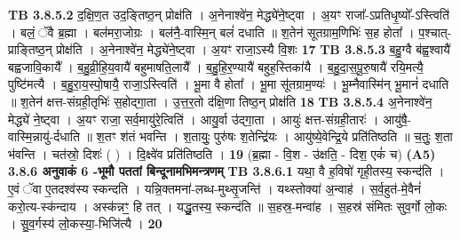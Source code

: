 \documentclass[17pt]{extarticle}
\begin{document}
{{{{{{{{{{{{{{{{{{{{{{                  \newline
                                \textbf{ TB 3.8.5.2} \newline
                  द॒क्षि॒ण॒त उद॒ङ्तिष्ठ॒न् प्रोक्ष॑ति । अ॒नेनाश्वे॑न॒ मेद्ध्ये॑ने॒ष्ट्वा । अ॒यꣳ राजा᳚-ऽप्रतिधृ॒ष्यो᳚-ऽस्त्विति॑ । बलं॒ ॅवै ब्र॒ह्मा । बल॑मरा॒जोग्रः । बल॑नै॒-वास्मि॒न् बलं॑ दधाति ॥ श॒तेन॑ सूतग्राम॒णिभिः॑ स॒ह होता᳚ । प॒श्चात्-प्राङ्तिष्ठ॒न् प्रोक्ष॑ति । अ॒नेनाश्वे॑न॒ मेद्ध्ये॑ने॒ष्ट्वा । अ॒यꣳ राजा॒ऽस्यै वि॒शः \textbf{ 17} \newline
                  \newline
                                \textbf{ TB 3.8.5.3} \newline
                  ब॒हु॒ग्वै ब॑ह्व॒श्वायै॑ बह्वजावि॒कायै᳚ । ब॒हु॒व्री॒हि॒य॒वायै॑ बहुमाषति॒लायै᳚ । ब॒हु॒हि॒र॒ण्यायै॑ बहुह॒स्तिका॑यै । ब॒हु॒दा॒स॒पू॒रु॒षायै॑ रयि॒मत्यै॒ पुष्टि॑मत्यै । ब॒हु॒रा॒य॒स्पो॒षायै॒ राजा॒ऽस्त्विति॑ । भू॒मा वै होता᳚ । भू॒मा सू॑तग्राम॒ण्यः॑ । भू॒म्नैवास्मि॑न् भू॒मानं॑ दधाति ॥ श॒तेन॑ क्षत्त-संग्रही॒तृभिः॑ स॒होद्गा॒ता । उ॒त्त॒र॒तो द॑क्षि॒णा तिष्ठ॒न् प्रोक्ष॑ति \textbf{ 18} \newline
                  \newline
                                \textbf{ TB 3.8.5.4} \newline
                  अ॒नेनाश्वे॑न॒ मेद्ध्ये॑ ने॒ष्ट्वा । अ॒यꣳ राजा॒ सर्व॒मायु॑रे॒त्विति॑ । आयु॒र्वा उ॑द्गा॒ता । आयुः॑ क्षत्त-संग्रही॒तारः॑ । आयु॑षै॒-वास्मि॒न्नायु॑-र्दधाति ॥ श॒तꣳ श॑तं भवन्ति । श॒तायुः॒ पुरु॑षः श॒तेन्द्रि॑यः । आयु॑ष्ये॒वेन्द्रि॒ये प्रति॑तिष्ठति ॥ च॒तुः॒ श॒ता भ॑वन्ति । चत॑स्रो॒ दिशः॑ ( ) । दि॒क्ष्वे॑व प्रति॑तिष्ठति । \textbf{ 19} \newline
                  \newline
                                    (ब्र॒ह्मा - वि॒श - उ॑क्षति॒ - दिश॒ एकं॑ च) \textbf{(A5)} \newline \newline
                \textbf{ 3.8.6     अनुवाकं   6 -भूमौ पततां बिन्दूनामभिमन्त्रणम्} \newline
                                \textbf{ TB 3.8.6.1} \newline
                  यथा॒ वै ह॒विषो॑ गृही॒तस्य॒ स्कन्द॑ति । ए॒वं ॅवा ए॒तदश्व॑स्य स्कन्दति । यन्नि॒क्तमना॑-लब्ध-मुथ्सृ॒जन्ति॑ । यथ्स्तोक्या॑ अ॒न्वाह॑ । स॒र्व॒हुत॑-मे॒वैनं॑ करो॒त्य-स्क॑न्दाय । अस्क॑न्नꣳ॒॒ हि तत् । यद्धु॒तस्य॒ स्कन्द॑ति ॥ स॒हस्र॒-मन्वा॑ह । स॒हस्र॑ संमितः सुव॒र्गो लो॒कः । सु॒व॒र्गस्य॑ लो॒कस्या॒-भिजि॑त्यै । \textbf{ 20} \newline
                  \newline
}}}}}}}}}}}}}}}}}}}}}}
\end{document}
